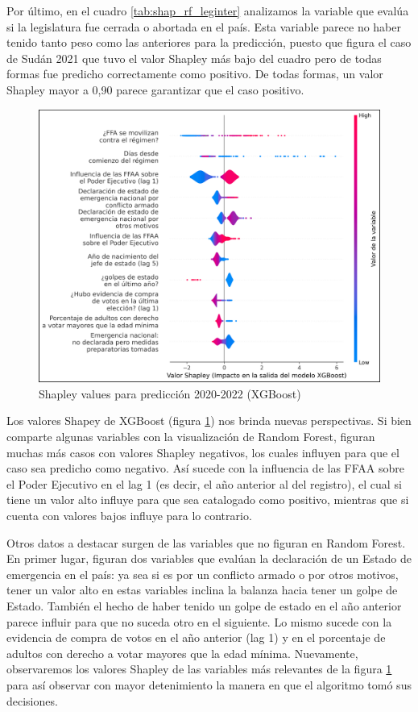 \documentclass{article}
\begin{document}
Por último, en el cuadro \ref{tab:shap_rf_leginter} analizamos la variable que evalúa si la legislatura 
fue cerrada o abortada en el país. Esta variable parece no haber tenido tanto peso como las anteriores 
para la predicción, puesto que figura el caso de Sudán 2021 que tuvo el valor Shapley más bajo del 
cuadro pero de todas formas fue predicho correctamente como positivo. De todas formas, un valor Shapley
mayor a 0,90 parece garantizar que el caso positivo.

\begin{figure}[H]
  \centering
  \includegraphics[width=1\textwidth]{10_shapley_values_xgb.png}
  \caption{Shapley values para predicción 2020-2022 (XGBoost)\label{fig:shapley_xgb}}
\end{figure}

Los valores Shapey de XGBoost (figura \ref{fig:shapley_xgb}) nos brinda nuevas perspectivas. 
Si bien comparte algunas variables con la visualización de Random Forest, figuran muchas más
casos con valores Shapley negativos, los cuales influyen para que el caso sea predicho como negativo. 
Así sucede con la influencia de las FFAA sobre el Poder Ejecutivo en el lag 1 (es decir, el año 
anterior al del registro),  el cual si tiene un valor alto influye para que sea catalogado como 
positivo, mientras que si cuenta con valores bajos influye para lo contrario.

Otros datos a destacar surgen de las variables que no figuran en Random Forest. En primer lugar,
figuran dos variables que evalúan la declaración de un Estado de emergencia en el país: ya sea si es 
por un conflicto armado o por otros motivos, tener un valor alto en estas variables inclina la balanza 
hacia tener un golpe de Estado. También el hecho de haber tenido un golpe de estado en el año anterior 
parece influir para que no suceda otro en el siguiente. Lo mismo sucede con la evidencia de compra de 
votos en el año anterior (lag 1) y en el porcentaje de adultos con derecho a votar mayores que la edad 
mínima. Nuevamente, observaremos los valores Shapley de las variables más relevantes de la figura
\ref{fig:shapley_xgb} para así observar con mayor detenimiento la manera en que el algoritmo tomó
sus decisiones.
\end{document}
